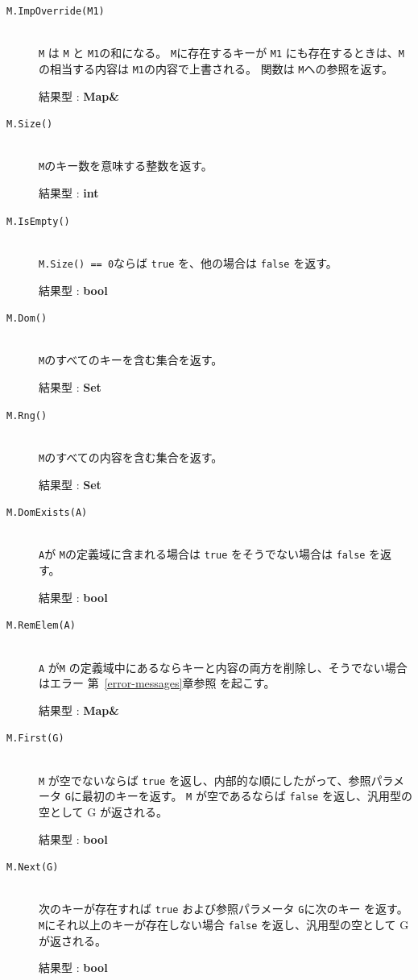 \documentclass[\pformat,12pt]{jarticle}
\begin{document}
\begin{description}
\item[{\tt M.ImpOverride(M1)}] \mbox{}\\     
     {\tt M} は {\tt M} と {\tt M1}の和になる。 
{\tt M}に存在するキーが {\tt M1} にも存在するときは、{\tt M}の相当する内容は {\tt M1}の内容で上書される。 
     関数は {\tt M}への参照を返す。

     結果型 : {\bf Map\&}

\item[{\tt M.Size()}] \mbox{}\\
     {\tt M}のキー数を意味する整数を返す。

     結果型 : {\bf int}

\item[{\tt M.IsEmpty()}] \mbox{}\\
     {\tt M.Size() == 0}ならば {\tt true} を、他の場合は {\tt false} を返す。

     結果型 : {\bf bool}
     
\item[{\tt M.Dom()}] \mbox{}\\     
     {\tt M}のすべてのキーを含む集合を返す。   

     結果型 : {\bf Set}
    
\item[{\tt M.Rng()}] \mbox{}\\     
      {\tt M}のすべての内容を含む集合を返す。

     結果型 : {\bf Set}

\item[{\tt M.DomExists(A)}] \mbox{}\\     
     {\tt A}が {\tt M}の定義域に含まれる場合は {\tt true} をそうでない場合は {\tt false} を返す。

     結果型 : {\bf bool}

\item[{\tt M.RemElem(A)}] \mbox{}\\     
      {\tt A} が{\tt M} の定義域中にあるならキーと内容の両方を削除し、そうでない場合はエラー  第~\ref{error-messages}章参照 を起こす。

     結果型 : {\bf Map\&}

\item[{\tt M.First(G)}] \mbox{}\\     
      {\tt M} が空でないならば {\tt true} を返し、内部的な順にしたがって、参照パラメータ {\tt G}に最初のキーを返す。
 {\tt M} が空であるならば {\tt false} を返し、汎用型の空として G が返される。

     結果型 : {\bf bool}
     
\item[{\tt M.Next(G)}] \mbox{}\\
     次のキーが存在すれば {\tt true} および参照パラメータ {\tt G}に次のキー を返す。 
 {\tt M}にそれ以上のキーが存在しない場合 {\tt false} を返し、汎用型の空として G が返される。

     結果型 : {\bf bool}
\end{description}
\end{document}
